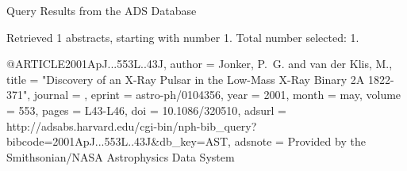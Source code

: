 Query Results from the ADS Database


Retrieved 1 abstracts, starting with number 1.  Total number selected: 1.

@ARTICLE{2001ApJ...553L..43J,
   author = {{Jonker}, P.~G. and {van der Klis}, M.},
    title = "{Discovery of an X-Ray Pulsar in the Low-Mass X-Ray Binary 2A 1822-371}",
  journal = {\apjl},
   eprint = {astro-ph/0104356},
     year = 2001,
    month = may,
   volume = 553,
    pages = {L43-L46},
      doi = {10.1086/320510},
   adsurl = {http://adsabs.harvard.edu/cgi-bin/nph-bib_query?bibcode=2001ApJ...553L..43J&db_key=AST},
  adsnote = {Provided by the Smithsonian/NASA Astrophysics Data System}
}


